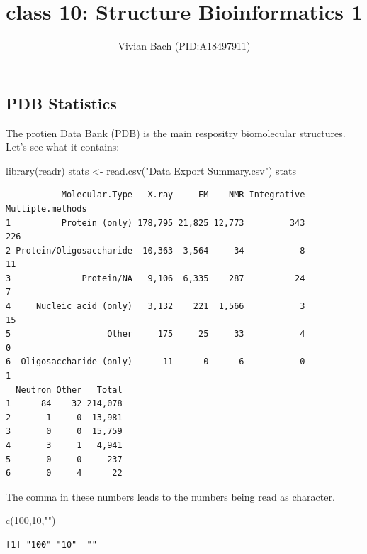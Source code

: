 \documentclass[
  letterpaper,
  DIV=11,
  numbers=noendperiod]{scrartcl}
\title{class 10: Structure Bioinformatics 1}
\author{Vivian Bach (PID:A18497911)}
\date{}
\newenvironment{Shaded}{\begin{snugshade}}{\end{snugshade}}
\newcommand{\DecValTok}[1]{\textcolor[rgb]{0.68,0.00,0.00}{#1}}
\newcommand{\FunctionTok}[1]{\textcolor[rgb]{0.28,0.35,0.67}{#1}}
\newcommand{\NormalTok}[1]{\textcolor[rgb]{0.00,0.23,0.31}{#1}}
\newcommand{\OtherTok}[1]{\textcolor[rgb]{0.00,0.23,0.31}{#1}}
\newcommand{\StringTok}[1]{\textcolor[rgb]{0.13,0.47,0.30}{#1}}
\begin{document}
\maketitle


\subsection{PDB Statistics}\label{pdb-statistics}

The protien Data Bank (PDB) is the main respositry biomolecular
structures. Let's see what it contains:

\begin{Shaded}
\begin{Highlighting}[]
\FunctionTok{library}\NormalTok{(readr)}
\NormalTok{stats }\OtherTok{\textless{}{-}} \FunctionTok{read.csv}\NormalTok{(}\StringTok{"Data Export Summary.csv"}\NormalTok{)}
\NormalTok{stats}
\end{Highlighting}
\end{Shaded}

\begin{verbatim}
           Molecular.Type   X.ray     EM    NMR Integrative Multiple.methods
1          Protein (only) 178,795 21,825 12,773         343              226
2 Protein/Oligosaccharide  10,363  3,564     34           8               11
3              Protein/NA   9,106  6,335    287          24                7
4     Nucleic acid (only)   3,132    221  1,566           3               15
5                   Other     175     25     33           4                0
6  Oligosaccharide (only)      11      0      6           0                1
  Neutron Other   Total
1      84    32 214,078
2       1     0  13,981
3       0     0  15,759
4       3     1   4,941
5       0     0     237
6       0     4      22
\end{verbatim}

The comma in these numbers leads to the numbers being read as character.

\begin{Shaded}
\begin{Highlighting}[]
\FunctionTok{c}\NormalTok{(}\DecValTok{100}\NormalTok{,}\DecValTok{10}\NormalTok{,}\StringTok{""}\NormalTok{)}
\end{Highlighting}
\end{Shaded}

\begin{verbatim}
[1] "100" "10"  ""   
\end{verbatim}
\end{document}
